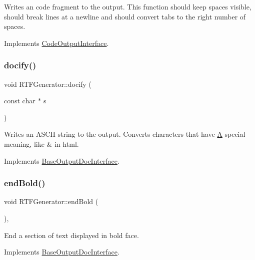 Writes an code fragment to the output. This function should keep spaces visible, should break lines at a newline and should convert tabs to the right number of spaces. 

Implements \mbox{\hyperlink{class_code_output_interface_aa29a5eedda08596ace50ed5b59c8ae7f}{Code\+Output\+Interface}}.

\mbox{\label{class_r_t_f_generator_a0e292cd3d60599a4ddfad4036c0b6d46}} 
\subsubsection{\texorpdfstring{docify()}{docify()}}
{\footnotesize\ttfamily void R\+T\+F\+Generator\+::docify (\begin{DoxyParamCaption}\item[{const char $\ast$}]{s }\end{DoxyParamCaption})\hspace{0.3cm}{\ttfamily [virtual]}}

Writes an A\+S\+C\+II string to the output. Converts characters that have \mbox{\hyperlink{class_a}{A}} special meaning, like {\ttfamily \&} in html. 

Implements \mbox{\hyperlink{class_base_output_doc_interface_ad7d3f6631bd157739170690e669b3e75}{Base\+Output\+Doc\+Interface}}.

\mbox{\label{class_r_t_f_generator_a430a7df863505527d0b1da4c70116a05}} 
\subsubsection{\texorpdfstring{endBold()}{endBold()}}
{\footnotesize\ttfamily void R\+T\+F\+Generator\+::end\+Bold (\begin{DoxyParamCaption}{ }\end{DoxyParamCaption})\hspace{0.3cm}{\ttfamily [inline]}, {\ttfamily [virtual]}}

End a section of text displayed in bold face. 

Implements \mbox{\hyperlink{class_base_output_doc_interface_a2a17911ba778f8efac83999fb5d190d9}{Base\+Output\+Doc\+Interface}}.

